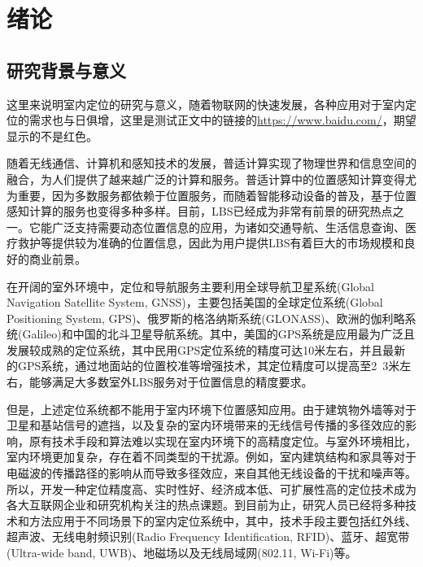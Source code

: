 



\chapter{绪论}

\section{研究背景与意义}

这里来说明室内定位的研究与意义，随着物联网的快速发展，各种应用对于室内定位的需求也与日俱增，这里是测试正文中的链接的\url{https://www.baidu.com/}，期望显示的不是红色。

随着无线通信、计算机和感知技术的发展，普适计算实现了物理世界和信息空间的融合，为人们提供了越来越广泛的计算和服务。普适计算中的位置感知计算变得尤为重要，因为多数服务都依赖于位置服务，而随着智能移动设备的普及，基于位置感知计算的服务也变得多种多样。目前，LBS已经成为非常有前景的研究热点之一。它能广泛支持需要动态位置信息的应用，为诸如交通导航、生活信息查询、医疗救护等提供较为准确的位置信息，因此为用户提供LBS有着巨大的市场规模和良好的商业前景。

在开阔的室外环境中，定位和导航服务主要利用全球导航卫星系统(Global Navigation Satellite System, GNSS)，主要包括美国的全球定位系统(Global Positioning System, GPS)、俄罗斯的格洛纳斯系统(GLONASS)、欧洲的伽利略系统(Galileo)和中国的北斗卫星导航系统。其中，美国的GPS系统是应用最为广泛且发展较成熟的定位系统，其中民用GPS定位系统的精度可达10米左右，并且最新的GPS系统，通过地面站的位置校准等增强技术，其定位精度可以提高至2~3米左右，能够满足大多数室外LBS服务对于位置信息的精度要求。

但是，上述定位系统都不能用于室内环境下位置感知应用。由于建筑物外墙等对于卫星和基站信号的遮挡，以及复杂的室内环境带来的无线信号传播的多径效应的影响，原有技术手段和算法难以实现在室内环境下的高精度定位。与室外环境相比，室内环境更加复杂，存在着不同类型的干扰源。例如，室内建筑结构和家具等对于电磁波的传播路径的影响从而导致多径效应，来自其他无线设备的干扰和噪声等。所以，开发一种定位精度高、实时性好、经济成本低、可扩展性高的定位技术成为各大互联网企业和研究机构关注的热点课题。到目前为止，研究人员已经将多种技术和方法应用于不同场景下的室内定位系统中，其中，技术手段主要包括红外线、超声波、无线电射频识别(Radio Frequency Identification, RFID)、蓝牙、超宽带(Ultra-wide band, UWB)、地磁场以及无线局域网(802.11, Wi-Fi)等。



